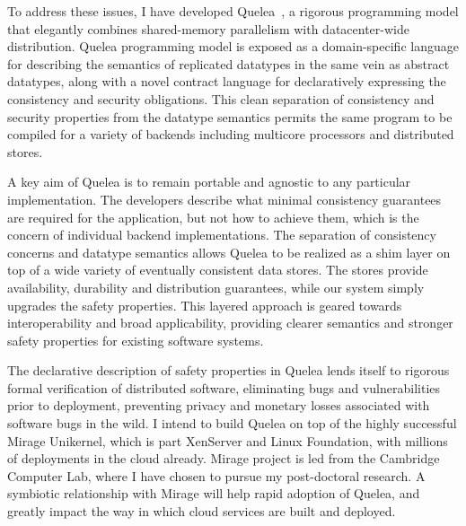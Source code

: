 \documentclass{article}
\begin{document}
To address these issues, I have developed Quelea~\cite{quelea}, a rigorous
programming model that elegantly combines shared-memory parallelism with
datacenter-wide distribution. Quelea programming model is exposed as a
domain-specific language for describing the semantics of replicated datatypes
in the same vein as abstract datatypes, along with a novel contract language
for declaratively expressing the consistency and security obligations. This
clean separation of consistency and security properties from the datatype
semantics permits the same program to be compiled for a variety of backends
including multicore processors and distributed stores.

A key aim of Quelea is to remain portable and agnostic to any particular
implementation. The developers describe what minimal consistency guarantees are
required for the application, but not how to achieve them, which is the concern
of individual backend implementations. The separation of consistency concerns
and datatype semantics allows Quelea to be realized as a shim layer on top of a
wide variety of eventually consistent data stores. The stores provide
availability, durability and distribution guarantees, while our system simply
upgrades the safety properties. This layered approach is geared towards
interoperability and broad applicability, providing clearer semantics and
stronger safety properties for existing software systems.

The declarative description of safety properties in Quelea lends itself to
rigorous formal verification of distributed software, eliminating bugs and
vulnerabilities prior to deployment, preventing privacy and monetary losses
associated with software bugs in the wild. I intend to build Quelea on top of
the highly successful Mirage Unikernel, which is part XenServer and Linux
Foundation, with millions of deployments in the cloud already. Mirage project
is led from the Cambridge Computer Lab, where I have chosen to pursue my
post-doctoral research. A symbiotic relationship with Mirage will help rapid
adoption of Quelea, and greatly impact the way in which cloud services are
built and deployed.


\small

\end{document}
